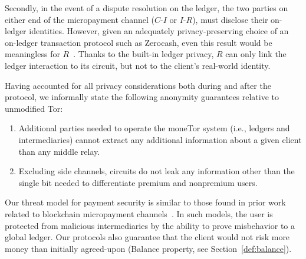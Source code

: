 Secondly, in the event of a dispute resolution on the ledger, the two parties on either end of the micropayment channel ($C$-$I$ or $I$-$R$), must disclose their on-ledger identities.
However, given an adequately privacy-preserving choice of an on-ledger transaction protocol such as Zerocash, even this result would be meaningless for $R$~\cite{sasson2014zerocash}.
Thanks to the built-in ledger privacy, $R$ can only link the ledger interaction to its circuit, but not to the client's real-world identity.

Having accounted for all privacy considerations both during and after the protocol, we informally state the following anonymity guarantees relative to unmodified Tor:

\begin{enumerate}
\item Additional parties needed to operate the moneTor system (i.e., ledgers and intermediaries) cannot extract any additional information about a given client than any middle relay.
\item Excluding side channels, circuits do not leak any information other than the single bit needed to differentiate premium and nonpremium users.
\end{enumerate}

Our threat model for payment security is similar to those found in prior work related to blockchain micropayment channels~\cite{poon2016bitcoin}.
In such models, the user is protected from malicious intermediaries by the ability to prove misbehavior to a global ledger.
Our protocols also guarantee that the client would not risk more money than initially agreed-upon (Balance property, see Section~\ref{def:balance}).

